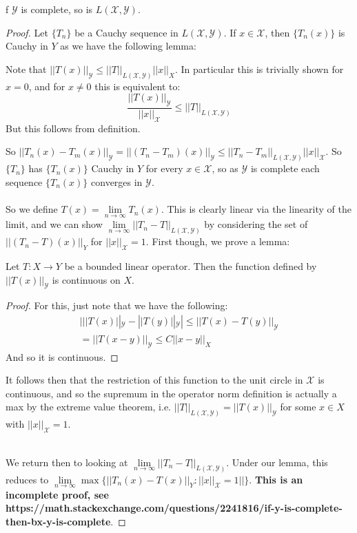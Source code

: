 \documentclass[12pt]{article}
\newcommand{\X}{\mathcal{X}}
\newcommand{\Y}{\mathcal{Y}}
\newenvironment{theorem}[2][Theorem]{\begin{trivlist}
\item[\hskip \labelsep {\bfseries #1}\hskip \labelsep {\bfseries #2.}]}{\end{trivlist}}
\newenvironment{lemma}[2][Lemma]{\begin{trivlist}
\item[\hskip \labelsep {\bfseries #1}\hskip \labelsep {\bfseries #2.}]}{\end{trivlist}}
\begin{document}
\begin{theorem}
    If $\Y$ is complete, so is $L(\X, \Y)$.
    \begin{proof}
        Let $\{T_n\}$ be a Cauchy sequence in $L(\X, \Y)$. If $x \in \X$, then $\{T_n(x)\}$ is Cauchy in $Y$ as we have the following lemma:
        \begin{lemma}{(Operator norm)}
            Note that $||T(x)||_{\Y} \leq ||T||_{L(\X, \Y)}||x||_{X}$. In particular this is trivially shown for $x = 0$, and for $x \neq 0$ this is equivalent to:
            $$\frac{||T(x)||_{\Y}}{||x||_{\X}} \leq ||T||_{L(\X, \Y)}$$
            But this follows from definition.
        \end{lemma}
        So $||T_n(x) - T_m(x)||_{\Y} = ||(T_n - T_m)(x)||_{\Y} \leq ||T_n - T_m||_{L(\X, \Y)}||x||_{\mathcal{X}}$. So $\{T_n\}$ has $\{T_n(x)\}$ Cauchy in $Y$ for every $x \in \X$, so as $\Y$ is complete each sequence $\{T_n(x)\}$ converges in $\Y$. \\ \\
        So we define $T(x) = \underset{n \rightarrow \infty}{\lim} T_n(x)$. This is clearly linear via the linearity of the limit, and we can show $\underset{n \rightarrow \infty}{\lim} ||T_n - T||_{L(\X, \Y)}$ by considering the set of $||(T_n - T)(x)||_{Y}$ for $||x||_{\X} = 1$. First though, we prove a lemma:
        \begin{lemma}{(Operator norm is actually a max)}
            Let $T : X \rightarrow Y$ be a bounded linear operator. Then the function defined by $||T(x)||_{\Y}$ is continuous on $X$. 
            \begin{proof}
                For this, just note that we have the following:
                \begin{equation}
                    \begin{aligned}
                    |||T(x)||_{\Y} - ||T(y)||_{\Y}| \leq ||T(x) - T(y)||_{\Y} \\
                    = ||T(x-y)||_{\Y} \leq C||x-y||_{X}
                    \end{aligned}
                \end{equation}
                And so it is continuous.
            \end{proof}
            It follows then that the restriction of this function to the unit circle in $\X$ is continuous, and so the supremum in the operator norm definition is actually a max by the extreme value theorem, i.e. $||T||_{L(\X, \Y)} = ||T(x)||_{\Y}$ for some $x \in X$ with $||x||_{\X} = 1$. \\ \\
        \end{lemma}
        We return then to looking at $\underset{n \rightarrow \infty}{\lim} ||T_n - T||_{L(\X, \Y)}$. Under our lemma, this reduces to $\underset{n \rightarrow \infty}{\lim} \max\{||T_n(x) - T(x)||_{Y} : ||x||_{\X} = 1||\}$. 
        \textbf{This is an incomplete proof, see https://math.stackexchange.com/questions/2241816/if-y-is-complete-then-bx-y-is-complete}.
    \end{proof}
\end{theorem}
\end{document}
